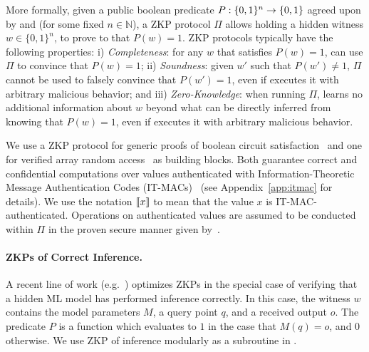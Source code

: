 More formally, given a public boolean predicate $P: \nolinebreak \{0,1\}^n \to \{0,1\}$ agreed upon by \prover and \verifier (for some fixed $n \in \mathbb{N}$), a ZKP protocol $\Pi$ allows \prover holding a hidden witness $w \in \{0,1\}^n$, to prove to \verifier that $P(w)=1$. ZKP protocols typically have the following properties: i) \emph{Completeness}: for any $w$ that satisfies $P(w)=1$, \prover can use $\Pi$ to convince \verifier that $P(w)=1$; ii) \emph{Soundness}: given $w'$ such that $P(w')\neq 1$, $\Pi$ cannot be used to falsely convince \verifier that $P(w')=1$, even if \prover executes it with arbitrary malicious behavior; and iii) \emph{Zero-Knowledge}: when running $\Pi$, \verifier learns no additional information about $w$ beyond what can be directly inferred from knowing that $P(w)=1$, even if \verifier executes it with arbitrary malicious behavior.

We use a ZKP protocol for generic proofs of boolean circuit satisfaction~\cite{weng2021wolverine} and one for verified array random access~\cite{franzese2021zkram} as building blocks. Both guarantee correct and confidential computations over values authenticated with Information-Theoretic Message Authentication Codes (IT-MACs)~\cite{damgaard2012itmac,nielsen2012itmac} (see Appendix~\ref{app:itmac} for details). We use the notation $\llbracket x \rrbracket$ to mean that the value $x$ is IT-MAC-authenticated. Operations on authenticated values are assumed to be conducted within $\Pi$ in the proven secure manner given by~\cite{weng2021wolverine}.

\paragraph{ZKPs of Correct Inference.} A recent line of work (e.g.~\cite{weng2021mystique, lee2024vCNN, sun2024zkllm, hao2024nonlinear}) optimizes ZKPs in the special case of verifying that a hidden ML model has performed inference correctly. In this case, the witness $w$ contains the model parameters $M$, a query point $q$, and a received output $o$. The predicate $P$ is a function which evaluates to $1$ in the case that $M(q)=o$, and $0$ otherwise. We use ZKP of inference modularly as a subroutine in \name. %


